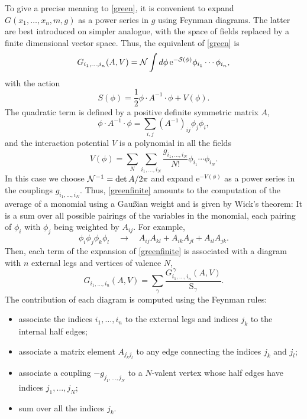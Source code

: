 \documentclass[12pt,here,feynmf]{article}
\begin{document}
To give a precise meaning to \eqref{green}, it is convenient to expand  $G(x_{1},\dots,x_{n},m,g)$ as a power series in $g$ using Feynman diagrams. The latter are best introduced on simpler analogue, with the space of fields replaced by a finite dimensional vector space. Thus, the equivalent of \eqref{green} is
\begin{equation}
G_{i_{1},\dots,i_{n}}(A,V)={\cal N}\int d\phi\,\mathrm{e}^{-\cal{S}(\phi)}\phi_{i_{1}}\cdots\phi_{i_{n}},
\label{greenfinite}
\end{equation}
with the action
\begin{equation}
S(\phi)=\frac{1}{2}\phi\cdot A^{-1}\cdot\phi +V(\phi).
\end{equation}
The quadratic term is defined by a positive definite symmetric matrix $A$,
\begin{equation}
\phi\cdot A^{-1}\!\cdot\phi=\sum_{i,j}(A^{-1})_{ij}\phi_{j}\phi_{i},
\end{equation}
and the interaction potential $V$ is a polynomial in all the fields
\begin{equation}
V(\phi)=\sum_{N}\sum_{i_{1},\dots,i_{N}}\frac{g_{i_{1},\dots,i_{N}}}{N!}\phi_{i_{1}}\cdots\phi_{i_{N}}.
\label{finitepot}
\end{equation}
In this case we choose ${\cal N}^{-1}=\det A/2\pi$ and expand $\mathrm{e}^{-V(\phi)}$ as a power series in the couplings $g_{i_{1},\dots,i_{N}}$. Thus, \eqref{greenfinite} amounts to the computation of the average of a monomial using a Gau\ss ian weight and is given by Wick's theorem: It is a sum over all possible pairings of the variables in the monomial, each pairing of $\phi_{i}$ with $\phi_{j}$ being weighted by $A_{ij}$. For example,
 \begin{equation}
 \phi_{i} \phi_{j} \phi_{k} \phi_{l}\quad\rightarrow\quad
A_{ij}A_{kl}+A_{ik}A_{jl}+A_{il}A_{jk}.
\end{equation}
Then, each term of the expansion of \eqref{greenfinite} is associated with a diagram with $n$ external legs and vertices of valence $N$,
\begin{equation}
G_{i_{1},\dots,i_{n}}(A,V)=\sum_{\gamma}\frac{G^{\,\gamma}_{i_{1},\dots,i_{n}}(A,V)}{\mathrm{S}_{\gamma}}\label{finitediag}.
\end{equation}
The contribution of each diagram is computed using the Feynman rules:
\begin{itemize}
\item
associate the indices $i_{1},\dots,i_{n}$ to the external legs and indices $j_{k}$ to the internal half edges;
\item
associate a matrix element $A_{j_{k}j_{l}}$ to any edge connecting the indices $j_k$ and $j_l$;
\item
associate a coupling $-g_{j_{1},\dots,j_{N}}$ to a $N$-valent vertex  whose half edges have indices $j_{1},\dots,j_{N}$;
\item
sum over all the indices $j_{k}$.
\end{itemize}
\end{document}
